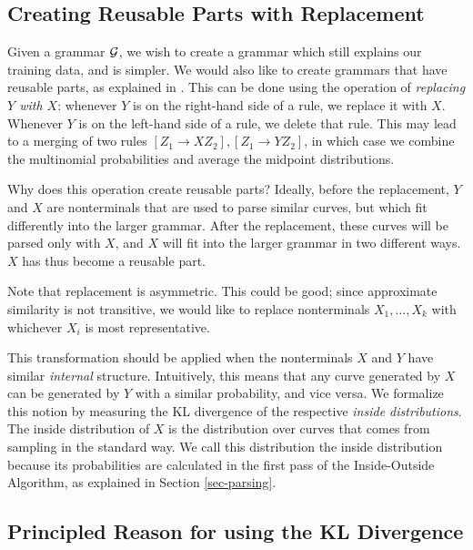 


\subsection{Creating Reusable Parts with Replacement}
\label{sec-replacement}

Given a grammar ${\mathcal G}$, we wish to create a grammar which still
explains our training data, and is simpler. We would also like to
create grammars that have reusable parts, as explained in
\cite{amit-bernstein}. This can be done using
the operation of \emph{replacing $Y$ with $X$}: whenever $Y$ is on the
right-hand side of a rule, we replace it with $X$. Whenever $Y$ is on
the left-hand side of a rule, we delete that rule. This may lead to a
merging of two rules $[Z_1 \to X Z_2], [Z_1 \to Y Z_2]$, in which case
we combine the multinomial probabilities and average the midpoint
distributions.

Why does this operation create reusable parts? Ideally, before the
replacement, $Y$ and $X$ are nonterminals that are used to parse
similar curves, but which fit differently into the larger
grammar. After the replacement, these curves will be parsed only with
$X$, and $X$ will fit into the larger grammar in two different
ways. $X$ has thus become a reusable part.

Note that replacement is asymmetric. This could be good; since
approximate similarity is not transitive, we would like to replace
nonterminals $X_1,\dots, X_k$ with whichever $X_i$ is most
representative.

This transformation should be applied when the nonterminals $X$ and
$Y$ have similar \emph{internal} structure. Intuitively, this means
that any curve generated by $X$ can be generated by $Y$ with a similar
probability, and vice versa. We formalize this notion by measuring the
KL divergence of the respective \emph{inside distributions}. The
inside distribution of $X$ is the distribution over curves that comes
from sampling in the standard way. We call this distribution the
inside distribution because its probabilities are calculated in the
first pass of the Inside-Outside Algorithm, as explained in Section
\ref{sec-parsing}.

\subsection{Principled Reason for using the KL Divergence}

